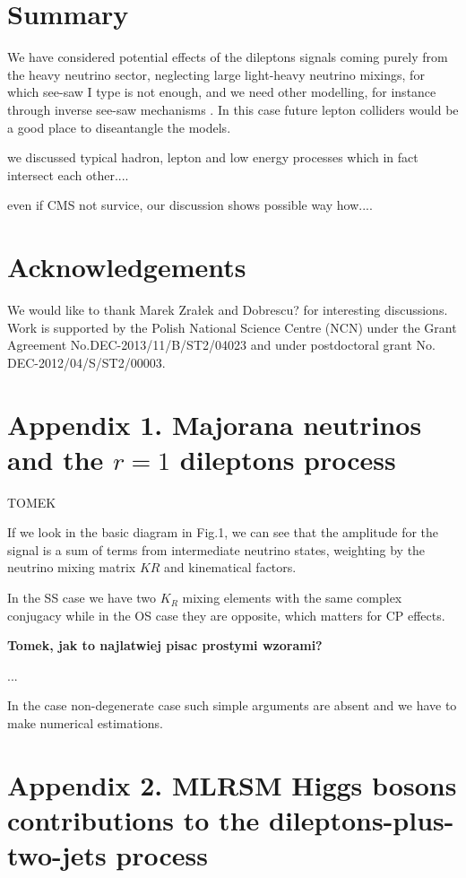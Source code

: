 \documentclass[twocolumn,superscriptaddress,showpacs,prl,nofootinbib,floatfix]{revtex4}
\begin{document}
\section{Summary}
We have considered potential effects of the dileptons signals coming purely from the heavy neutrino sector, neglecting large light-heavy neutrino mixings, for which see-saw I type is not enough, and we need other modelling, for instance through inverse see-saw mechanisms \cite{}. In this case future lepton colliders would be a good place to diseantangle the models.

we discussed typical hadron, lepton and low energy processes which in fact intersect each other....

even if CMS not survice, our discussion shows possible way how....

  

\section*{Acknowledgements}

We would like to thank Marek Zra\l ek  and Dobrescu? for interesting discussions. 
%
Work is supported by the Polish National Science Centre (NCN) under the Grant Agreement No.\linebreak[4] DEC-2013/11/B/ST2/04023 and under postdoctoral grant No. DEC-2012/04/S/ST2/00003.

\section{Appendix 1. Majorana neutrinos and the  $r=1$ dileptons process \label{appdir}}

TOMEK

If we look in the basic diagram in Fig.1, we can see that the amplitude for the signal is a sum of terms from intermediate neutrino states, weighting by the neutrino mixing matrix $KR$ and kinematical factors.



In the SS case we have two $K_R$ mixing elements with the same complex conjugacy while in the OS case they are opposite, which matters for CP effects.

{\bf Tomek, jak to najlatwiej pisac prostymi wzorami?}

...

In the case non-degenerate case such simple arguments are absent and we have to make numerical estimations. 

\section{Appendix 2. MLRSM Higgs bosons contributions to the dileptons-plus-two-jets process \label{appscal}} 
\end{document}
